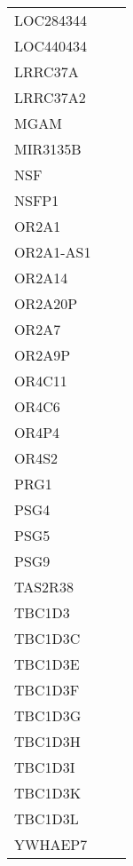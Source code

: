 \begin{tabular}{lcc}
LOC284344    &                &            \\
LOC440434    &                &            \\
LRRC37A      &                &            \\
LRRC37A2     &                &            \\
MGAM         &                &            \\
MIR3135B     &                &            \\
NSF          &                &            \\
NSFP1        &                &            \\
OR2A1        &                &            \\
OR2A1-AS1    &                &            \\
OR2A14       &                &            \\
OR2A20P      &                &            \\
OR2A7        &                &            \\
OR2A9P       &                &            \\
OR4C11       &                &            \\
OR4C6        &                &            \\
OR4P4        &                &            \\
OR4S2        &                &            \\
PRG1         &                &            \\
PSG4         &                &            \\
PSG5         &                &            \\
PSG9         &                &            \\
TAS2R38      &                &            \\
TBC1D3       &                &            \\
TBC1D3C      &                &            \\
TBC1D3E      &                &            \\
TBC1D3F      &                &            \\
TBC1D3G      &                &            \\
TBC1D3H      &                &            \\
TBC1D3I      &                &            \\
TBC1D3K      &                &            \\
TBC1D3L      &                &            \\
YWHAEP7      &                &            \\
\bottomrule
\end{tabular}
